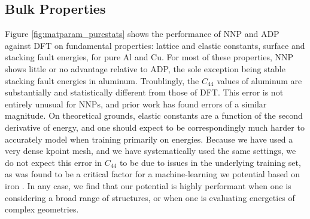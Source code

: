 \documentclass{article}
\begin{document}
\subsection{Bulk Properties}

Figure \ref{fig:matparam_purestats} shows the performance of NNP and ADP against DFT on fundamental properties: lattice and elastic constants, surface and stacking fault energies, for pure Al and Cu.
For most of these properties, NNP shows little or no advantage relative to ADP, the sole exception being stable stacking fault energies in aluminum.
Troublingly, the $C_{44}$ values of aluminum are substantially and statistically different from those of DFT.
This error is not entirely unusual for NNPs, and prior work has found errors of a similar magnitude\cite{Zuo2020APotentials}.
On theoretical grounds, elastic constants are a function of the second derivative of energy, and one should expect to be correspondingly much harder to accurately model when training primarily on energies.
Because we have used a very dense kpoint mesh, and we have systematically used the same settings, we do not expect this error in $C_{44}$ to be due to issues in the underlying training set, as was found to be a critical factor for a machine-learning we potential based on iron \cite{Dragoni2018AchievingIron}.  
In any case, we find that our potential is highly performant when one is considering a broad range of structures, or when one is evaluating energetics of complex geometries. 
\end{document}
